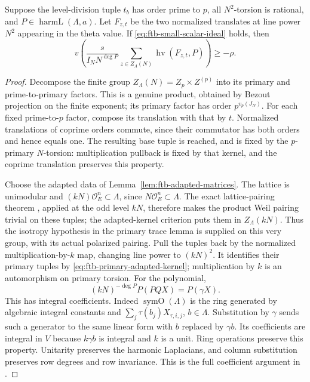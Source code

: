 \begin{srlemma}
\label{lem:ftb-coprime-translates-scalar}
Suppose the level-division tuple \(t_b\) has order prime to \(p\),
all \(N^2\)-torsion is rational, and \(P\in\operatorname{harmL}(\Lambda,a)\).
Let \(F_{z,t}\) be the two normalized translates at line power \(N^2\)
appearing in the theta value.  If
\eqref{eq:ftb-small-scalar-ideal} holds, then
\[
 v\!\left(\frac{s}{I_N N^{\deg P}}
           \sum_{z\in Z_\Lambda(N)}
                     \operatorname{hv}(F_{z,t},P)\right)\ge-\rho .
\]
\end{srlemma}
\begin{proof}
Decompose the finite group \(Z_\Lambda(N)=Z_p\times Z^{(p)}\)
into its primary and prime-to-primary factors.
This is a genuine product, obtained by Bezout projection on the
finite exponent; its primary factor has order
\(p^{v_p(J_N)}\).
For each fixed prime-to-\(p\) factor, compose its translation with
that by \(t\).
Normalized translations of coprime orders commute, since their
commutator has both orders and hence equals one.
The resulting base tuple is reached, and is fixed by the
\(p\)-primary \(N\)-torsion: multiplication pullback is fixed by
that kernel, and the coprime translation preserves this property.

Choose the adapted data of Lemma~\ref{lem:ftb-adapted-matrices}.
The lattice is unimodular and
\((kN)\mathcal O_E^n\subset\Lambda\), since
\(N\mathcal O_E^n\subset\Lambda\).
The exact lattice-pairing theorem
, applied at the odd
level \(kN\), therefore makes the product Weil pairing trivial
on these tuples; the adapted-kernel criterion puts them in
\(Z_\Lambda(kN)\).  Thus the isotropy hypothesis in the primary
trace lemma is supplied on this very group, with its actual
polarized pairing.
Pull the tuples back by the normalized multiplication-by-\(k\)
map, changing line power to \((kN)^2\).
It identifies their primary tuples by
\eqref{eq:ftb-primary-adapted-kernel}; multiplication by \(k\) is
an automorphism on primary torsion.
For the polynomial,
\[
                 (kN)^{-\deg P}P(PQX)=P(\gamma X).
\]
This has integral coefficients.
Indeed \(\operatorname{symO}(\Lambda)\) is the ring generated by
algebraic integral constants and
\(\sum_j\tau(b_j)X_{\tau,i,j}\), \(b\in\Lambda\).
Substitution by \(\gamma\) sends such a generator to the same
linear form with \(b\) replaced by \(\gamma b\).
Its coefficients are integral in \(V\) because \(k\gamma b\) is
integral and \(k\) is a unit.
Ring operations preserve this property.
Unitarity preserves the harmonic Laplacians, and column
substitution preserves row degrees and row invariance.
This is the full coefficient argument in
.


\end{proof}
